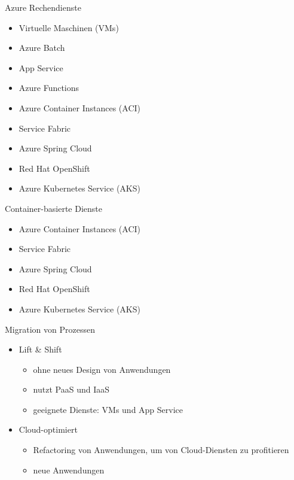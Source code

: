 

\begin{flashcard}[]{Azure Rechendienste}
  \begin{itemize}
    \item Virtuelle Maschinen (VMs)
    \item Azure Batch
    \item App Service
    \item Azure Functions
    \item Azure Container Instances (ACI)
    \item Service Fabric
    \item Azure Spring Cloud
    \item Red Hat OpenShift
    \item Azure Kubernetes Service (AKS)
  \end{itemize}
\end{flashcard}

\begin{flashcard}[]{Container-basierte Dienste}
  \begin{itemize}
    \item Azure Container Instances (ACI)
    \item Service Fabric
    \item Azure Spring Cloud
    \item Red Hat OpenShift
    \item Azure Kubernetes Service (AKS)
  \end{itemize}
\end{flashcard}

\begin{flashcard}[]{Migration von Prozessen}
  \begin{itemize}
    \item Lift \& Shift
      \begin{itemize}
        \item ohne neues Design von Anwendungen
        \item nutzt PaaS und IaaS
        \item geeignete Dienste: VMs und App Service
      \end{itemize}
    \item Cloud-optimiert
      \begin{itemize}
        \item Refactoring von Anwendungen, um von Cloud-Diensten zu profitieren
        \item neue Anwendungen
      \end{itemize}
  \end{itemize}
\end{flashcard}

